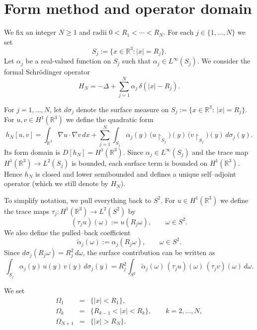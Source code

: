 \documentclass[a4paper,11pt]{article}
\numberwithin{equation}{section}
\def\re{\mathbb{R}}
\theoremstyle{definition}
\theoremstyle{remark}
\begin{document}

\section{Form method and operator domain}\label{sec:form}

We fix an integer $N\ge1$ and radii $0<R_1<\cdots<R_N$.
For each $j\in\{1,\dots,N\}$ we set
$$
S_j:=\{x\in\re^3:|x|=R_j\}.
$$
Let $\alpha_j$ be a real-valued function on $S_j$ such that
$\alpha_j\in L^\infty(S_j)$.
We consider the formal Schr\"odinger operator
\begin{equation}\label{eq:HN-formal}
H_N=-\Delta+\sum_{j=1}^N \alpha_j\,\delta(|x|-R_j).
\end{equation}

For $j=1,\dots,N$, let $d\sigma_j$ denote the surface measure on
$S_j:=\{x\in\re^3:\ |x|=R_j\}$.
For $u,v\in H^1(\re^3)$ we define the quadratic form
\begin{equation}\label{eq:qN}
h_N[u,v]
=
\int_{\re^3}\nabla u\cdot\nabla v\,dx
+
\sum_{j=1}^N \int_{S_j}
\alpha_j(y)\,
\bigl(u\upharpoonright_{S_j}\bigr)(y)\,
\bigl(v\upharpoonright_{S_j}\bigr)(y)\,
d\sigma_j(y).
\end{equation}
Its form domain is $D[h_N]=H^1(\re^3)$.
Since $\alpha_j\in L^\infty(S_j)$ and the trace map $H^1(\re^3)\to L^2(S_j)$ is bounded,
each surface term is bounded on $H^1(\re^3)$.
Hence $h_N$ is closed and lower semibounded and defines a unique self--adjoint operator
(which we still denote by $H_N$).

To simplify notation, we pull everything back to $S^2$.
For $u\in H^1(\re^3)$ we define the trace maps $\tau_j:H^1(\re^3)\to L^2(S^2)$ by
$$
(\tau_j u)(\omega):=u(R_j\omega),
\qquad
\omega\in S^2.
$$
We also define the pulled--back coefficient
$$
\widetilde\alpha_j(\omega):=\alpha_j(R_j\omega),
\qquad
\omega\in S^2.
$$
Since $d\sigma_j(R_j\omega)=R_j^2\,d\omega$, the surface contribution can be written as
$$
\int_{S_j}\alpha_j(y)\,u(y)\,v(y)\,d\sigma_j(y)
=
R_j^2\int_{S^2}\widetilde\alpha_j(\omega)\,(\tau_j u)(\omega)\,(\tau_j v)(\omega)\,d\omega.
$$

We set
\begin{eqnarray*}
\Omega_1 &=& \bigl\{|x|<R_1\bigr\},\\
\Omega_k &=& \bigl\{R_{k-1}<|x|<R_k\bigr\},\qquad k=2,\dots,N,\\
\Omega_{N+1} &=& \bigl\{|x|>R_N\bigr\}.
\end{eqnarray*}
\end{document}

